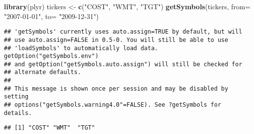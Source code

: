 \documentclass[]{article}
\newenvironment{Shaded}{\begin{snugshade}}{\end{snugshade}}
\newcommand{\ControlFlowTok}[1]{\textcolor[rgb]{0.13,0.29,0.53}{\textbf{#1}}}
\newcommand{\DataTypeTok}[1]{\textcolor[rgb]{0.13,0.29,0.53}{#1}}
\newcommand{\KeywordTok}[1]{\textcolor[rgb]{0.13,0.29,0.53}{\textbf{#1}}}
\newcommand{\NormalTok}[1]{#1}
\newcommand{\OperatorTok}[1]{\textcolor[rgb]{0.81,0.36,0.00}{\textbf{#1}}}
\newcommand{\StringTok}[1]{\textcolor[rgb]{0.31,0.60,0.02}{#1}}
\begin{document}
\begin{Shaded}
\begin{Highlighting}[]
\KeywordTok{library}\NormalTok{(plyr)}
\NormalTok{tickers <-}\StringTok{ }\KeywordTok{c}\NormalTok{(}\StringTok{"COST"}\NormalTok{, }\StringTok{"WMT"}\NormalTok{, }\StringTok{"TGT"}\NormalTok{)}
\KeywordTok{getSymbols}\NormalTok{(tickers, }\DataTypeTok{from=} \StringTok{"2007-01-01"}\NormalTok{, }\DataTypeTok{to=} \StringTok{"2009-12-31"}\NormalTok{)}
\end{Highlighting}
\end{Shaded}

\begin{verbatim}
## 'getSymbols' currently uses auto.assign=TRUE by default, but will
## use auto.assign=FALSE in 0.5-0. You will still be able to use
## 'loadSymbols' to automatically load data. getOption("getSymbols.env")
## and getOption("getSymbols.auto.assign") will still be checked for
## alternate defaults.
## 
## This message is shown once per session and may be disabled by setting 
## options("getSymbols.warning4.0"=FALSE). See ?getSymbols for details.
\end{verbatim}

\begin{verbatim}
## [1] "COST" "WMT"  "TGT"
\end{verbatim}

\begin{Shaded}
\end{Shaded}
\end{document}
